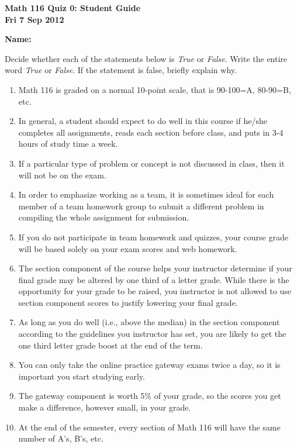 \documentclass[11pt,letterpaper]{article}
\begin{document}
\flushleft
\begin{multicols}{2}


\begin{large}\textbf{Math 116 Quiz 0: Student Guide \\
Fri 7 Sep 2012}\end{large}

\textbf{Name:  }\underline{\hspace{35ex}}

\vspace{.5in}

\end{multicols}

\pagestyle{empty}


\flushleft

Decide whether each of the statements below is \emph{True} or \emph{False}.  Write the entire word \emph{True} or \emph{False}.  If the statement is false, briefly explain why.  


\begin{enumerate}
\item  Math 116 is graded on a normal 10-point scale, that is 90-100=A, 80-90=B, etc.  
\vfill
\item  In general, a student should expect to do well in this course if he/she completes all assignments, reads each section before class, and puts in 3-4 hours of study time a week.
\vfill
\item If a particular type of problem or concept is not discussed in class, then it will not be on the exam.
\vfill
\item In order to emphasize working as a team, it is sometimes ideal for each member of a team homework group to submit a different problem in compiling the whole assignment for submission.
\vfill
\item If you do not participate in team homework and quizzes, your course grade will be based solely on your exam scores and web homework.
\vfill
\item The section component of the course helps your instructor determine if your final grade may be altered by one third of a letter grade.  While there is the opportunity for your grade to be raised, you instructor is not allowed to use section component scores to justify lowering your final grade.
\vfill
\item As long as you do well (i.e., above the median) in the section component according to the guidelines you instructor has set, you are likely to get the one third letter grade boost at the end of the term. 
\vfill
\item You can only take the online practice gateway exams twice a day, so it is important you start studying early.
\vfill
\item The gateway component is worth 5\% of your grade, so the scores you get make a difference, however small, in your grade. 
\vfill
\item  At the end of the semester, every section of Math 116 will have the same number of A's, B's, etc.

\end{enumerate}
\end{document}
